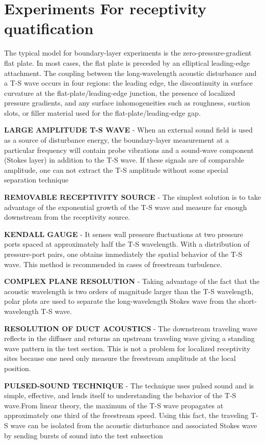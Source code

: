 \documentclass[twoside]{iitbreport}
\begin{document}
\section{Experiments For receptivity quatification}
The typical model for boundary-layer experiments is the zero-pressure-gradient
flat plate. In most cases, the flat plate is preceded by an elliptical leading-edge
attachment. The coupling between the long-wavelength acoustic disturbance
and a T-S wave occurs in four regions: the leading edge, the discontinuity in
surface curvature at the flat-plate/leading-edge junction, the presence of localized
pressure gradients, and any surface inhomogeneities such as roughness, suction
slots, or filler material used for the flat-plate/leading-edge gap.

\textbf{LARGE AMPLITUDE T-S WAVE} - When an external sound field is used as a source of disturbance
energy, the boundary-layer measurement at a particular frequency will contain
probe vibrations and a sound-wave component (Stokes layer) in addition to the
T-S wave. If these signals are of comparable amplitude, one can not extract the
T-S amplitude without some special separation technique

\textbf{REMOVABLE RECEPTIVITY SOURCE} - The simplest solution is to take advantage of the
exponential growth of the T-S wave and measure far enough downstream from
the receptivity source.

\textbf{KENDALL GAUGE} - It senses wall pressure
fluctuations at two pressure ports spaced at approximately half the T-S
wavelength. With a distribution of pressure-port pairs,
one obtains immediately the spatial behavior of the T-S wave. This method is
recommended in cases of freestream turbulence.

\textbf{COMPLEX PLANE RESOLUTION} - Taking advantage of the fact that
the acoustic wavelength is two orders of magnitude larger than the T-S wavelength,
polar plots are used to separate the long-wavelength Stokes wave from the
short-wavelength T-S wave.

\textbf{RESOLUTION OF DUCT ACOUSTICS} - The downstream traveling wave reflects in the
diffuser and returns an upstream traveling wave giving a standing wave pattern in
the test section. This is not a problem for localized receptivity sites because one
need only measure the freestream amplitude at the local position.

\textbf{PULSED-SOUND TECHNIQUE} - The technique uses pulsed sound and is
simple, effective, and lends itself to understanding the behavior of the
T-S wave.From linear theory, the maximum of the
T-S wave propagates at approximately one third of the freestream speed.
Using this fact, the traveling T-S wave can be isolated from the acoustic disturbance and associated
Stokes wave by sending bursts of sound into the test subsection


\end{document}

